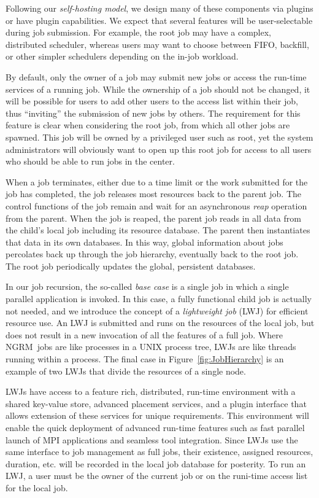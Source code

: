 \documentclass[10pt]{article}
\newcommand{\ngrm}{NGRM}
\begin{document}
Following our {\em self-hosting model}, we design many of these components
via plugins or have plugin capabilities. We expect that several features will
be user-selectable during job submission. For example, the root
job may have a complex, distributed scheduler, whereas users may
want to choose between FIFO, backfill, or other simpler schedulers
depending on the in-job workload.

By default, only the owner of a job may submit new jobs or access
the run-time services of a running job.  While the ownership of a job
should not be changed, it will be possible for users to add other
users to the access list within their job, thus ``inviting'' the
submission of new jobs by others. The requirement for this feature
is clear when considering the root job, from which all other jobs
are spawned. This job will be owned by a privileged user such as
root, yet the system administrators will obviously want to open
up this root job for access to all users who should be able to
run jobs in the center.

When a job terminates, either due to a time limit or the work
submitted for the job has completed, the job releases most resources
back to the parent job. The control functions of the job remain and
wait for an asynchronous {\em reap} operation from the parent. When
the job is reaped, the parent job reads in all data from the child's
local job including its resource database. The parent then instantiates that data in
its own databases. In this way, global information about jobs
percolates back up through the job hierarchy, eventually back to
the root job.  The root job periodically updates the global,
persistent databases.

In our job recursion, the so-called {\em base case} is a
single job in which a single parallel application is invoked. In 
this case, a fully functional child job is actually not needed,
and we introduce the concept of a {\em lightweight job} (LWJ) for efficient
resource use. An LWJ is 
submitted and runs on the resources of the local job, but does not result in
a new invocation of all the features of a full job. Where
\ngrm\ jobs are like processes in a UNIX process tree, LWJs 
are like threads running within a process.
The final case in Figure~\ref{fig:JobHierarchy} is an example
of two LWJs that divide the resources of a single node.


LWJs have access to a feature rich, distributed,
run-time environment with a shared key-value store, advanced
placement services, and a plugin interface that allows extension
of these services for unique requirements. This environment will
enable the quick deployment of advanced run-time features such as
fast parallel launch of MPI applications and seamless tool integration. 
Since LWJs use the same interface to job management as full
jobs, their existence, assigned resources, duration, etc.
will be recorded in the local job database for posterity.
To run an LWJ, a user must be the owner of the current
job or on the runi-time access list for the local job.
\end{document}

